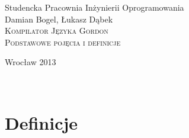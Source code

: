 \documentclass[12pt]{article}
\begin{document}
\begin{titlepage}
\begin{center}
Studencka Pracownia Inżynierii Oprogramowania\\[3.5cm]

Damian Bogel, Łukasz Dąbek\\[1cm]
\textsc{\LARGE Kompilator Języka Gordon}\\[1cm]
\textsc{\large Podstawowe pojęcia i definicje}

\vfill
Wrocław 2013

\end{center}
\end{titlepage}

\newpage
\setcounter{page}{2}
~
\newpage

\section{Definicje}
\end{document}
